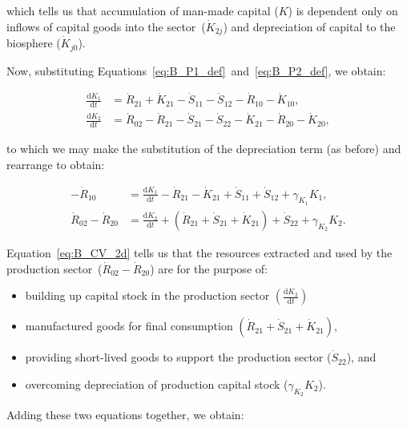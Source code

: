 \noindent{}which tells us that accumulation 
of man-made capital ($K$) is dependent
only on inflows of capital goods into the 
sector~($\dot{K}_{2j}$) and depreciation
of capital to the biosphere ($\dot{K}_{j0}$).

Now, substituting
Equations~\ref{eq:B_P1_def}~and~\ref{eq:B_P2_def},
we obtain:

\begin{align} 
\label{eq:B_CV_1c}
	 \frac{\mathrm{d}K_{1}}{\mathrm{d}t}	&
	=  \dot{R}_{21}
	+ \dot{K}_{21}
	- \dot{S}_{11}
	- \dot{S}_{12} 
	- \dot{R}_{10} 
	- \dot{K}_{10},							\\
\label{eq:B_CV_2c}
	\frac{\mathrm{d}K_{2}}{\mathrm{d}t}	&
	=  \dot{R}_{02} 
	- \dot{R}_{21}
	- \dot{S}_{21}
	- \dot{S}_{22}
	- \dot{K}_{21}	 
	- \dot{R}_{20} 
	- \dot{K}_{20},
\end{align}

\noindent{}to which we may make the 
substitution of the depreciation term (as before)
and rearrange to obtain:

\begin{align} 
\label{eq:B_CV_1d}
	- \dot{R}_{10} 	 										&
	 = \frac{\mathrm{d}K_{1}}{\mathrm{d}t}
	-  \dot{R}_{21}
	- \dot{K}_{21}
	+ \dot{S}_{11}
	+ \dot{S}_{12} 
	+ \gamma_{K_{1}}K_{1},											\\
\label{eq:B_CV_2d}
	\dot{R}_{02}
	- \dot{R}_{20} 											&
	= \frac{\mathrm{d}K_{2}}{\mathrm{d}t}	
	+ \left(\dot{R}_{21}
	+ \dot{S}_{21}
	+ \dot{K}_{21}\right)	 
	+ \dot{S}_{22}
	+ \gamma_{K_{2}}K_{2}.
\end{align}

Equation~\ref{eq:B_CV_2d} tells us that the resources
extracted and used by 
the production sector~($\dot{R}_{02} - \dot{R}_{20}$)
are for the purpose of:

\begin{itemize}
	\item building up capital stock
	in the production sector
	$\left(\frac{\mathrm{d}K_{2}}{\mathrm{d}t}\right)$
	\item manufactured goods 
	for final consumption
	$\left(\dot{R}_{21}
	+ \dot{S}_{21}
	+ \dot{K}_{21}\right)	$,
	\item providing short-lived goods
	to support the 
	production sector ($\dot{S}_{22}$), and
	\item overcoming depreciation of production 
	capital stock ($\gamma_{K_{2}}K_{2}$).
\end{itemize}

Adding these two equations together,
we obtain:

